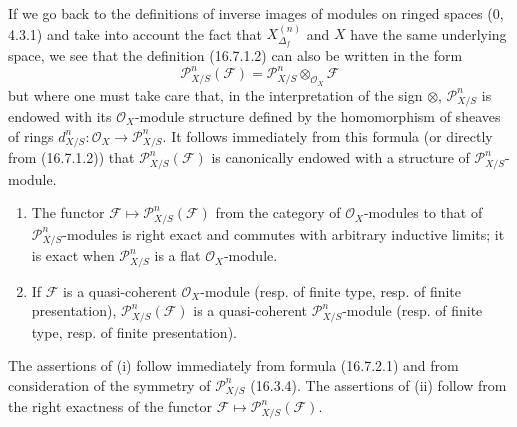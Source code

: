 \begin{env}[16.7.2]
\label{IV.16.7.2}
If we go back to the definitions of inverse images of modules on ringed
spaces (0, 4.3.1) and take into account the fact that
$X_{\Delta_f}^{(n)}$ and $X$ have the same underlying space, we see that the
definition (16.7.1.2) can also be written in the form
\[
  \mathscr{P}_{X/S}^n(\mathscr{F})
  =\mathscr{P}_{X/S}^n\otimes_{\mathcal{O}_X}\mathscr{F}
  \tag{16.7.2.1}
  \label{IV.16.7.2.1}
\]
but where one must take care that, in the interpretation of the sign $\otimes$,
$\mathscr{P}_{X/S}^n$ is endowed with its $\mathcal{O}_X$-module structure
defined by the homomorphism of sheaves of rings
$d_{X/S}^n:\mathcal{O}_X\to\mathscr{P}_{X/S}^n$. It follows immediately from
this formula (or directly from (16.7.1.2)) that
$\mathscr{P}_{X/S}^n(\mathscr{F})$ is canonically endowed with a structure of
$\mathscr{P}_{X/S}^n$-module.
\end{env}

\begin{proposition}[16.7.3]
\label{IV.16.7.3}
\begin{enumerate}
\item[(i)] The functor
$\mathscr{F}\mapsto\mathscr{P}_{X/S}^n(\mathscr{F})$ from the category of
$\mathcal{O}_X$-modules to that of $\mathscr{P}_{X/S}^n$-modules is
right exact and commutes with arbitrary inductive limits; it is exact
when $\mathscr{P}_{X/S}^n$ is a flat $\mathcal{O}_X$-module.
\item[(ii)] If $\mathscr{F}$ is a quasi-coherent $\mathcal{O}_X$-module
(resp. of finite type, resp. of finite presentation),
$\mathscr{P}_{X/S}^n(\mathscr{F})$ is a quasi-coherent
$\mathscr{P}_{X/S}^n$-module (resp. of finite type, resp. of finite
presentation).
\end{enumerate}
\end{proposition}

The assertions of (i) follow immediately from formula (16.7.2.1) and from
consideration of the symmetry of $\mathscr{P}_{X/S}^n$ (16.3.4). The
assertions of (ii) follow from the right exactness of the functor
$\mathscr{F}\mapsto\mathscr{P}_{X/S}^n(\mathscr{F})$.

